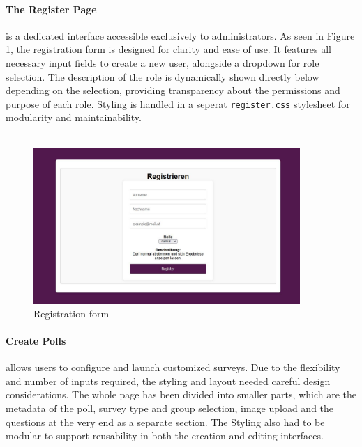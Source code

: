 \documentclass[a4paper,12pt]{report}
\begin{document}
\paragraph{The Register Page} is a dedicated interface accessible exclusively to administrators. As seen in Figure \ref{fig:register_view}, the registration form is designed for clarity and ease of use. It features all necessary input fields to create a new user, alongside a dropdown for role selection. The description of the role is dynamically shown directly below depending on the selection, providing transparency about the permissions and purpose of each role. Styling is handled in a seperat \texttt{register.css} stylesheet for modularity and maintainability.\\\\ 
\begin{figure}[H]
\centering
\includegraphics[width=0.9\textwidth]{pics/register_view.jpg}
\caption{Registration form}
\label{fig:register_view}
\end{figure}
\paragraph{Create Polls} allows users to configure and launch customized surveys. Due to the flexibility and number of inputs required, the styling and layout needed careful design considerations. The whole page has been divided into smaller parts, which are the metadata of the poll, survey type and group selection, image upload and the questions at the very end as a separate section. The Styling also had to be modular to support reusability in both the creation and editing interfaces.\\\\
\end{document}
